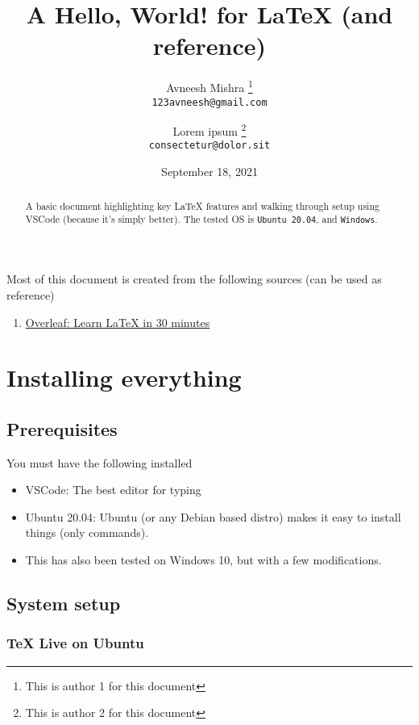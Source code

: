 \documentclass[]{article}
\title{A Hello, World! for \LaTeX{} (and reference)}
\author{
    Avneesh Mishra
    \thanks{This is author 1 for this document} \\
    \texttt{123avneesh@gmail.com}
    \and
    Lorem ipsum 
    \thanks{This is author 2 for this document} \\
    \texttt{consectetur@dolor.sit}
}
\date{September 18, 2021}
\begin{document}
\maketitle

\begin{abstract}
    
    A basic document highlighting key \LaTeX{} features and walking through setup using VSCode (because it's simply better). The tested OS is \texttt{Ubuntu 20.04}, and \texttt{Windows}.

\end{abstract}

Most of this document is created from the following sources (can be used as reference)

\begin{enumerate}
    \item \href{https://www.overleaf.com/learn/latex/Learn_LaTeX_in_30_minutes}{Overleaf: Learn LaTeX in 30 minutes}
\end{enumerate}

\tableofcontents

\section{Installing everything}

\subsection{Prerequisites}

You must have the following installed

\begin{itemize}
    \item VSCode: The best editor for typing
    \item Ubuntu 20.04: Ubuntu (or any Debian based distro) makes it easy to install things (only commands). 
    \item This has also been tested on Windows 10, but with a few modifications.
\end{itemize}

\subsection[Setup]{System setup}

\subsubsection*{TeX Live on Ubuntu}
\end{document}

